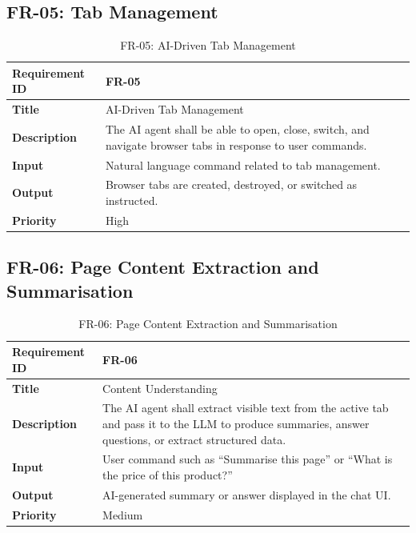\subsection{FR-05: Tab Management}
\begin{table}[H]
\centering
\caption{FR-05: AI-Driven Tab Management}
\begin{tabular}{|p{4cm}|p{10cm}|}
\hline
\textbf{Requirement ID} & FR-05 \\ \hline
\textbf{Title} & AI-Driven Tab Management \\ \hline
\textbf{Description} & The AI agent shall be able to open, close, switch, and navigate browser tabs in response to user commands. \\ \hline
\textbf{Input} & Natural language command related to tab management. \\ \hline
\textbf{Output} & Browser tabs are created, destroyed, or switched as instructed. \\ \hline
\textbf{Priority} & High \\ \hline
\end{tabular}
\end{table}

\needspace{7cm}
\subsection{FR-06: Page Content Extraction and Summarisation}
\begin{table}[H]
\centering
\caption{FR-06: Page Content Extraction and Summarisation}
\begin{tabular}{|p{4cm}|p{10cm}|}
\hline
\textbf{Requirement ID} & FR-06 \\ \hline
\textbf{Title} & Content Understanding \\ \hline
\textbf{Description} & The AI agent shall extract visible text from the active tab and pass it to the LLM to produce summaries, answer questions, or extract structured data. \\ \hline
\textbf{Input} & User command such as ``Summarise this page'' or ``What is the price of this product?'' \\ \hline
\textbf{Output} & AI-generated summary or answer displayed in the chat UI. \\ \hline
\textbf{Priority} & Medium \\ \hline
\end{tabular}
\end{table}

\needspace{7cm}
